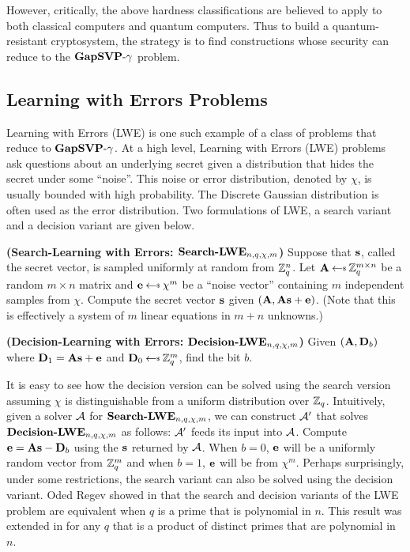 \noindent However, critically, the above hardness classifications are believed to apply to both classical computers and quantum computers. Thus to build a quantum-resistant cryptosystem, the strategy is to find constructions whose security can reduce to the $\textbf{GapSVP}\textnormal{-}\gamma$ problem.


\subsection{Learning with Errors Problems}
Learning with Errors (LWE) is one such example of a class of problems that reduce to $\textbf{GapSVP}\textnormal{-}\gamma$. At a high level, Learning with Errors (LWE) problems ask questions about an underlying secret given a distribution that hides the secret under some ``noise''. This noise or error distribution, denoted by $\chi$, is usually bounded with high probability. The Discrete Gaussian distribution is often used as the error distribution. Two formulations of LWE, a search variant and a decision variant are given below.

\begin{problem}
\textnormal{\textbf{(Search-Learning with Errors: $\textbf{Search-LWE}_{n,q,\chi,m}$)}} Suppose that $\mathbf{s}$, called the secret vector, is sampled uniformly at random from ${{\mathbb Z}}^n_q$. Let $\varvect{A} \getsr \Z^{m \times n}_q$ be a random $m \times n$ matrix and $\varvect{e} \getsr \chi^m$ be a ``noise vector'' containing $m$ independent samples from $\chi$. Compute the secret vector $\mathbf{s}$ given $\left(\mathbf{A}, \mathbf{A}\mathbf{s} + \mathbf{e} \right)$. (Note that this is effectively a system of $m$ linear equations in $m+n$ unknowns.)
\end{problem}

\begin{problem}
\textnormal{\textbf{(Decision-Learning with Errors: $\textbf{Decision-LWE}_{n,q,\chi,m}$)}}
Given $(\mathbf{A}, \mathbf{D}_b)$ where $\mathbf{D}_1 = \mathbf{A}\mathbf{s} + \mathbf{e}$ and $\varvect{D}_0 \getsr \Z^m_q$, find the bit $b$.
\end{problem}

\noindent It is easy to see how the decision version can be solved using the search version assuming $\chi$ is distinguishable from a uniform distribution over ${{\mathbb Z}}_q$. Intuitively, given a solver ${\mathcal A}$ for $\textbf{Search-LWE}_{n,q,\chi,m}$, we can construct ${\mathcal A}'$ that solves $\textbf{Decision-LWE}_{n,q,\chi,m}$ as follows: ${\mathcal A}'$ feeds its input into ${\mathcal A}$. Compute $\mathbf{e} = \mathbf{A}\mathbf{s} - \mathbf{D}_b$ using the $\mathbf{s}$ returned by ${\mathcal A}$. When $b=0$, $\mathbf{e}$ will be a uniformly random vector from ${{\mathbb Z}}^m_q$ and when $b=1$, $\mathbf{e}$ will be from $\chi^m$. Perhaps surprisingly, under some restrictions, the search variant can also be solved using the decision variant. Oded Regev showed in \cite{Regev2005} that the search and decision variants of the LWE problem are equivalent when $q$ is a prime that is polynomial in $n$. This result was extended in \cite{Peikert2009} for any $q$ that is a product of distinct primes that are polynomial in $n$.

